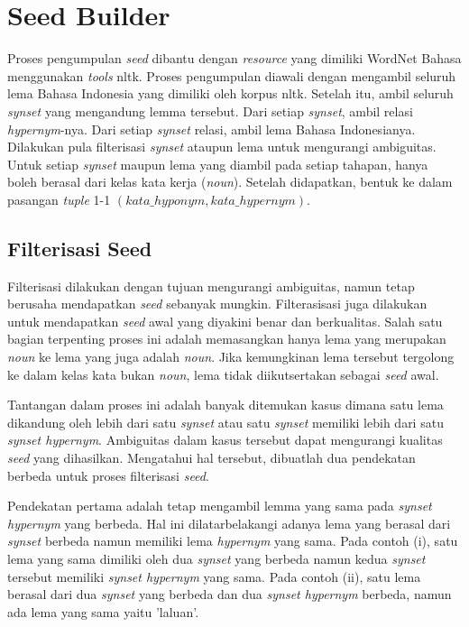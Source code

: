 \section{Seed Builder}
Proses pengumpulan \textit{seed} dibantu dengan \textit{resource} yang dimiliki WordNet Bahasa menggunakan \textit{tools} nltk. Proses pengumpulan diawali dengan mengambil seluruh lema Bahasa Indonesia yang dimiliki oleh korpus nltk. Setelah itu, ambil seluruh \textit{synset} yang mengandung lemma tersebut. Dari setiap \textit{synset}, ambil relasi \textit{hypernym}-nya. Dari setiap \textit{synset} relasi, ambil lema Bahasa Indonesianya. Dilakukan pula filterisasi \textit{synset} ataupun lema untuk mengurangi ambiguitas. Untuk setiap \textit{synset} maupun lema yang diambil pada setiap tahapan, hanya boleh berasal dari kelas kata kerja (\textit{noun}). Setelah didapatkan, bentuk ke dalam pasangan \textit{tuple} 1-1 $(kata\_hyponym,kata\_hypernym)$.

\subsection{Filterisasi Seed}
Filterisasi dilakukan dengan tujuan mengurangi ambiguitas, namun tetap berusaha mendapatkan \textit{seed} sebanyak mungkin. Filterasisasi juga dilakukan untuk mendapatkan \textit{seed} awal yang diyakini benar dan berkualitas. Salah satu bagian terpenting proses ini adalah memasangkan hanya lema yang merupakan \textit{noun} ke lema yang juga adalah \textit{noun}. Jika kemungkinan lema tersebut tergolong ke dalam kelas kata bukan \textit{noun}, lema tidak diikutsertakan sebagai \textit{seed} awal.

Tantangan dalam proses ini adalah banyak ditemukan kasus dimana satu lema dikandung oleh lebih dari satu \textit{synset} atau satu \textit{synset} memiliki lebih dari satu \textit{synset hypernym}. Ambiguitas dalam kasus tersebut dapat mengurangi kualitas \textit{seed} yang dihasilkan. Mengatahui hal tersebut, dibuatlah dua pendekatan berbeda untuk proses filterisasi \textit{seed}.

Pendekatan pertama adalah tetap mengambil lemma yang sama pada \textit{synset hypernym} yang berbeda. Hal ini dilatarbelakangi adanya lema yang berasal dari \textit{synset} berbeda namun memiliki lema \textit{hypernym} yang sama. Pada contoh (i), satu lema yang sama dimiliki oleh dua \textit{synset} yang berbeda namun kedua \textit{synset} tersebut memiliki \textit{synset hypernym} yang sama. Pada contoh (ii), satu lema berasal dari dua \textit{synset} yang berbeda dan dua \textit{synset hypernym} berbeda, namun ada lema yang sama yaitu 'laluan'.

